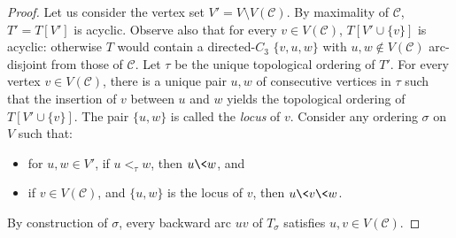 \begin{proof}
Let us consider the vertex set $V'=V \setminus V(\mathcal{C})$. By maximality of $\mathcal{C}$, $T'=T[V']$ is acyclic. Observe also that for every $v\in V(\mathcal{C})$, $T[V'\cup\{v\}]$ is acyclic: otherwise $T$ would contain a directed-$C_3$ $\{v,u,w\}$ with $u,w\notin V(\mathcal{C})$ arc-disjoint from those of $\mathcal{C}$. Let $\tau$ be the unique topological ordering of $T'$. For every vertex $v\in V(\mathcal{C})$, there is a unique pair $u,w$ of  consecutive vertices in $\tau$ such that the insertion of $v$ between $u$ and $w$ yields the topological ordering of $T[V'\cup\{v\}]$. The pair $\{u,w\}$ is called the \emph{locus} of $v$. Consider any ordering $\sigma$ on $V$ such that: 
\begin{itemize}
\vspace{-0.2cm}
\item for $u,w\in V'$, if $u<_{\tau} w$, then $u\<w$, and 
\vspace{-0.2cm}
\item if $v\in V(\mathcal{C})$, and $\{u,w\}$ is the locus of $v$, then $u\< v\<w$. 
\end{itemize}
By construction of $\sigma$, every backward arc $uv$ of $T_{\sigma}$ satisfies $u,v \in V(\mathcal{C})$.
\end{proof}

